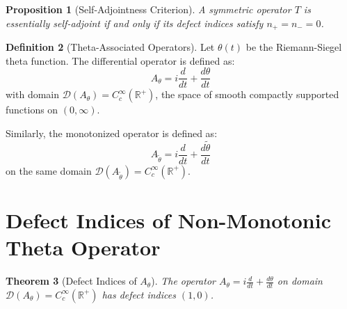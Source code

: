 \documentclass{article}
\newtheorem{theorem}{Theorem}
\newtheorem{proposition}[theorem]{Proposition}
\theoremstyle{definition}
\newtheorem{definition}[theorem]{Definition}
\begin{document}
\begin{proposition}[Self-Adjointness Criterion]
A symmetric operator $T$ is essentially self-adjoint if and only if its defect indices satisfy $n_+ = n_- = 0$.
\end{proposition}

\begin{definition}[Theta-Associated Operators]
Let $\theta(t)$ be the Riemann-Siegel theta function. The differential operator is defined as:
\begin{equation}
A_{\theta} = i\frac{d}{dt} + \frac{d\theta}{dt}
\end{equation}
with domain $\mathcal{D}(A_{\theta}) = C_c^{\infty}(\mathbb{R}^+)$, the space of smooth compactly supported functions on $(0,\infty)$.

Similarly, the monotonized operator is defined as:
\begin{equation}
A_{\tilde{\theta}} = i\frac{d}{dt} + \frac{d\tilde{\theta}}{dt}
\end{equation}
on the same domain $\mathcal{D}(A_{\tilde{\theta}}) = C_c^{\infty}(\mathbb{R}^+)$.
\end{definition}

\section{Defect Indices of Non-Monotonic Theta Operator}

\begin{theorem}[Defect Indices of $A_{\theta}$]
The operator $A_{\theta} = i\frac{d}{dt} + \frac{d\theta}{dt}$ on domain $\mathcal{D}(A_{\theta}) = C_c^{\infty}(\mathbb{R}^+)$ has defect indices $(1,0)$.
\end{theorem}
\end{document}
